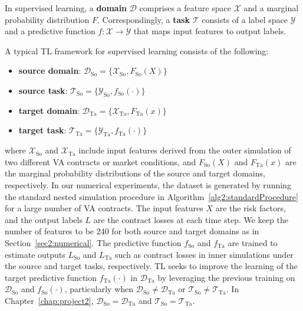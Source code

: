 In supervised learning, a \textbf{domain} $\mathcal{D}$ comprises a feature space $\mathcal{X}$ and a marginal probability distribution $F$. Correspondingly, a \textbf{task} $\mathcal{T}$ consists of a label space $\mathcal{Y}$ and a predictive function $f: \mathcal{X} \rightarrow \mathcal{Y}$ that maps input features to output labels.

A typical TL framework for supervised learning consists of the following:
\begin{itemize}
    \item   \textbf{source domain}: $\mathcal{D}_{\text{So}} = \{\mathcal{X}_{\text{So}}, F_{\text{So}}(X)\}$
    \item   \textbf{source task}: $\mathcal{T}_{\text{So}} = \{\mathcal{Y}_{\text{So}}, f_{\text{So}}(\cdot)\}$
    \item   \textbf{target domain}: $\mathcal{D}_{\text{Ta}} = \{\mathcal{X}_{\text{Ta}}, F_{\text{Ta}}(x)\}$
    \item   \textbf{target task}: $\mathcal{T}_{\text{Ta}} = \{\mathcal{Y}_{\text{Ta}}, f_{\text{Ta}}(\cdot)\}$
\end{itemize}

where $\mathcal{X}_{\text{So}}$ and $\mathcal{X}_{\text{Ta}}$ include input features derived from the outer simulation of two different VA contracts or market conditions, and $F_{\text{So}}(X)$ and $F_{\text{Ta}}(x)$ are the marginal probability distributions of the source and target domains, respectively.
In our numerical experiments, the dataset is generated by running the standard nested simulation procedure in Algorithm~\ref{alg2:standardProcedure} for a large number of VA contracts.
The input features $X$ are the risk factors, and the output labels $L$ are the contract losses at each time step.
We keep the number of features to be $240$ for both source and target domains as in Section~\ref{sec2:numerical}.
The predictive function $f_{\text{So}}$ and $f_{\text{Ta}}$ are trained to estimate outputs $L_{\text{So}}$ and $L_{\text{Ta}}$ such as contract losses in inner simulations under the source and target tasks, respectively.
TL seeks to improve the learning of the target predictive function $f_{\text{Ta}}(\cdot)$ in $\mathcal{D}_{\text{Ta}}$ by leveraging the previous training on $\mathcal{D}_{\text{So}}$ and $f_{\text{So}}(\cdot)$, particularly when $\mathcal{D}_{\text{So}} \neq \mathcal{D}_{\text{Ta}}$ or $\mathcal{T}_{\text{So}} \neq \mathcal{T}_{\text{Ta}}$.
In Chapter~\ref{chap:project2}, $\mathcal{D}_{\text{So}} = \mathcal{D}_{\text{Ta}}$ and $\mathcal{T}_{\text{So}} = \mathcal{T}_{\text{Ta}}$.

